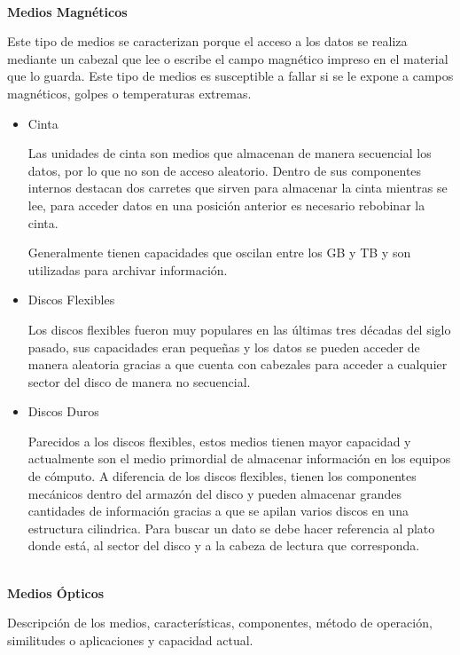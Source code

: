 \textbf{\\ Medios Magn\'{e}ticos \\}

Este tipo de medios se caracterizan porque el acceso a los datos se realiza mediante un cabezal que lee o escribe el campo magn\'{e}tico impreso en el material que lo guarda. Este tipo de medios es susceptible a fallar si se le expone a campos magn\'{e}ticos, golpes o temperaturas extremas.

\begin{itemize}
  \item Cinta
  
  Las unidades de cinta son medios que almacenan de manera secuencial los datos, por lo que no son de acceso aleatorio. Dentro de sus componentes internos destacan dos carretes que sirven para almacenar la cinta mientras se lee, para acceder datos en una posici\'{o}n anterior es necesario rebobinar la cinta.
  
  Generalmente tienen capacidades que oscilan entre los GB y TB  \cite{b306cc575a86d1e84e6ba100dcfb4417} y son utilizadas para archivar informaci\'{o}n.
  
  \item Discos Flexibles
  
  Los discos flexibles fueron muy populares en las \'{u}ltimas tres d\'{e}cadas del siglo pasado, sus capacidades eran peque\~{n}as y los datos se pueden acceder de manera aleatoria gracias a que cuenta con cabezales para acceder a cualquier sector del disco de manera no secuencial.
  
  \item Discos Duros
  
  Parecidos a los discos flexibles, estos medios tienen mayor capacidad y actualmente son el medio primordial de almacenar informaci\'{o}n en los equipos de c\'{o}mputo. A diferencia de los discos flexibles, tienen los componentes mec\'{a}nicos dentro del armaz\'{o}n del disco y pueden almacenar grandes cantidades de informaci\'{o}n gracias a que se apilan varios discos en una estructura cilindrica. Para buscar un dato se debe hacer referencia al plato donde est\'{a}, al sector del disco y a la cabeza de lectura que corresponda.
  
\end{itemize}

\textbf{\\ Medios \'{O}pticos \\}

Descripci\'{o}n de los medios, caracter\'{i}sticas, componentes, m\'{e}todo de operaci\'{o}n, similitudes o aplicaciones y capacidad actual.

